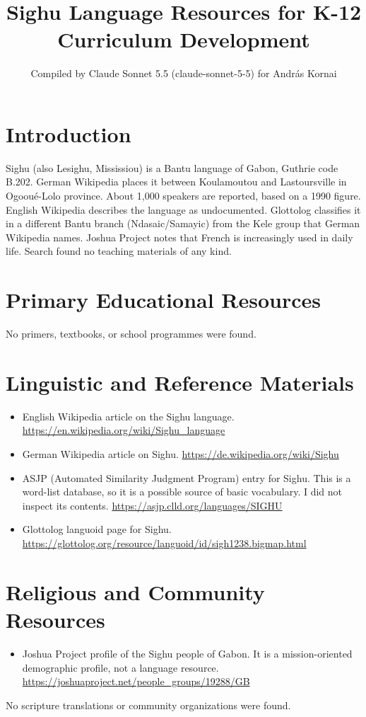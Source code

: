 \documentclass[12pt]{article}
\title{Sighu Language Resources for K-12 Curriculum Development}
\author{Compiled by Claude Sonnet 5.5 (claude-sonnet-5-5) for Andr\'as Kornai}
\date{}
\begin{document}
\maketitle

\section{Introduction}
Sighu (also Lesighu, Mississiou) is a Bantu language of Gabon, Guthrie code B.202. German Wikipedia places it between Koulamoutou and Lastoursville in Ogoou\'e-Lolo province. About 1,000 speakers are reported, based on a 1990 figure. English Wikipedia describes the language as undocumented. Glottolog classifies it in a different Bantu branch (Ndasaic/Samayic) from the Kele group that German Wikipedia names. Joshua Project notes that French is increasingly used in daily life. Search found no teaching materials of any kind.

\section{Primary Educational Resources}
No primers, textbooks, or school programmes were found.

\section{Linguistic and Reference Materials}
\begin{itemize}
\item English Wikipedia article on the Sighu language. \url{https://en.wikipedia.org/wiki/Sighu_language}
\item German Wikipedia article on Sighu. \url{https://de.wikipedia.org/wiki/Sighu}
\item ASJP (Automated Similarity Judgment Program) entry for Sighu. This is a word-list database, so it is a possible source of basic vocabulary. I did not inspect its contents. \url{https://asjp.clld.org/languages/SIGHU}
\item Glottolog languoid page for Sighu. \url{https://glottolog.org/resource/languoid/id/sigh1238.bigmap.html}
\end{itemize}

\section{Religious and Community Resources}
\begin{itemize}
\item Joshua Project profile of the Sighu people of Gabon. It is a mission-oriented demographic profile, not a language resource. \url{https://joshuaproject.net/people_groups/19288/GB}
\end{itemize}
No scripture translations or community organizations were found.
\end{document}
